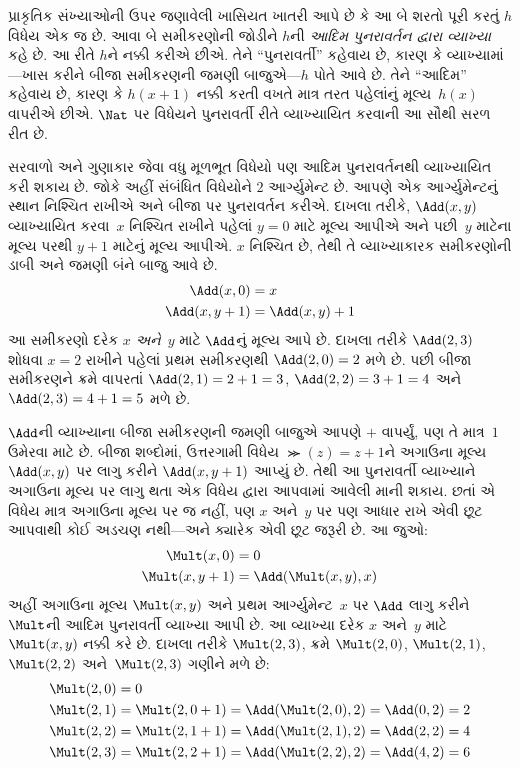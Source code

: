 પ્રાકૃતિક સંખ્યાઓની ઉપર જણાવેલી ખાસિયત ખાતરી આપે છે કે આ બે શરતો
પૂરી કરતું $h$ વિધેય એક જ છે. આવા બે સમીકરણોની જોડીને $h$ની
\emph{આદિમ પુનરાવર્તન દ્વારા વ્યાખ્યા} કહે છે. આ રીતે $h$ને
નક્કી કરીએ છીએ. તેને ``પુનરાવર્તી''
કહેવાય છે, કારણ કે વ્યાખ્યામાં---ખાસ કરીને બીજા સમીકરણની જમણી
બાજુએ---$h$ પોતે આવે છે. તેને ``આદિમ'' કહેવાય છે, કારણ કે
$h(x+1)$ નક્કી કરતી વખતે માત્ર તરત પહેલાંનું મૂલ્ય~$h(x)$ વાપરીએ
છીએ. $\Nat$ પર વિધેયને પુનરાવર્તી રીતે વ્યાખ્યાયિત કરવાની આ સૌથી
સરળ રીત છે.

સરવાળો અને ગુણાકાર જેવા વધુ મૂળભૂત વિધેયો પણ આદિમ પુનરાવર્તનથી
વ્યાખ્યાયિત કરી શકાય છે. જોકે અહીં સંબંધિત વિધેયોને $2$ આર્ગ્યુમેન્ટ
છે. આપણે એક આર્ગ્યુમેન્ટનું સ્થાન નિશ્ચિત રાખીએ અને બીજા પર
પુનરાવર્તન કરીએ. દાખલા તરીકે, $\Add(x, y)$ વ્યાખ્યાયિત કરવા~$x$
નિશ્ચિત રાખીને પહેલાં $y=0$ માટે મૂલ્ય આપીએ અને પછી~$y$ માટેના
મૂલ્ય પરથી $y+1$ માટેનું મૂલ્ય આપીએ. $x$ નિશ્ચિત છે, તેથી તે
વ્યાખ્યાકારક સમીકરણોની ડાબી અને જમણી બંને બાજુ આવે છે.
\begin{align*}
\Add(x,0) & =  x\\
\Add(x,y+1) & =  \Add(x,y)+1
\end{align*}
આ સમીકરણો દરેક $x$ \emph{અને}~$y$ માટે $\Add$નું મૂલ્ય આપે છે.
દાખલા તરીકે $\Add(2,3)$ શોધવા $x = 2$ રાખીને પહેલાં પ્રથમ સમીકરણથી
$\Add(2,0) = 2$ મળે છે. પછી બીજા સમીકરણને ક્રમે વાપરતાં
$\Add(2,1) = 2 + 1 = 3$, $\Add(2, 2) = 3 + 1 = 4$ અને $\Add(2,
3) = 4 + 1 = 5$ મળે છે.

$\Add$ની વ્યાખ્યાના બીજા સમીકરણની જમણી બાજુએ આપણે $+$ વાપર્યું,
પણ તે માત્ર~$1$ ઉમેરવા માટે છે. બીજા શબ્દોમાં, ઉત્તરગામી વિધેય
$\Succ(z) = z+1$ને અગાઉના મૂલ્ય $\Add(x,y)$ પર લાગુ કરીને
$\Add(x,y+1)$ આપ્યું છે. તેથી આ પુનરાવર્તી વ્યાખ્યાને અગાઉના
મૂલ્ય પર લાગુ થતા એક વિધેય દ્વારા આપવામાં આવેલી માની શકાય. છતાં
એ વિધેય માત્ર અગાઉના મૂલ્ય પર જ નહીં, પણ $x$ અને~$y$ પર પણ આધાર
રાખે એવી છૂટ આપવાથી કોઈ અડચણ નથી---અને ક્યારેક એવી છૂટ જરૂરી છે.
આ જુઓ:
\begin{align*}
  \Mult(x,0) & =  0 \\
  \Mult(x,y+1) & =  \Add(\Mult(x,y),x)
\end{align*}
અહીં અગાઉના મૂલ્ય $\Mult(x,y)$ અને પ્રથમ આર્ગ્યુમેન્ટ~$x$ પર
$\Add$ લાગુ કરીને $\Mult$ની આદિમ પુનરાવર્તી વ્યાખ્યા આપી છે.
આ વ્યાખ્યા દરેક $x$ અને~$y$ માટે $\Mult(x,y)$ નક્કી કરે છે.
દાખલા તરીકે $\Mult(2,3)$, ક્રમે $\Mult(2,0)$, $\Mult(2,1)$,
$\Mult(2,2)$ અને~$\Mult(2,3)$ ગણીને મળે છે:
\begin{align*}
  \Mult(2,0) & = 0\\
  \Mult(2,1) & = \Mult(2,0+1) =
  \Add(\Mult(2,0), 2) = \Add(0, 2) = 2\\
  \Mult(2,2) & = \Mult(2,1+1) =
  \Add(\Mult(2,1), 2) = \Add(2, 2) = 4\\
  \Mult(2,3) & = \Mult(2,2+1) =
  \Add(\Mult(2,2), 2) = \Add(4, 2) = 6
\end{align*}

